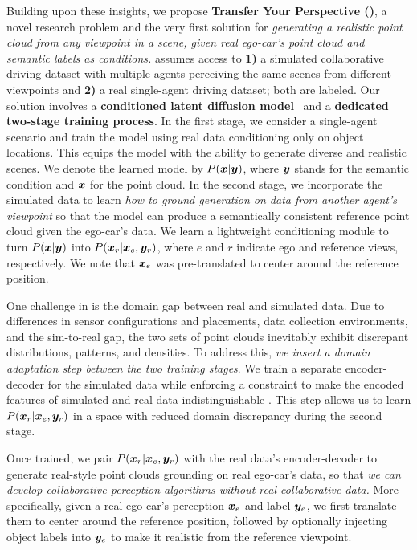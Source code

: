 Building upon these insights, we propose \textbf{Transfer Your Perspective (\ours)}, a novel research problem and the very first solution for \emph{generating a realistic point cloud from any viewpoint in a scene, given real ego-car's point cloud and semantic labels as conditions.} \ours assumes access to \textbf{1)} a simulated collaborative driving dataset with multiple agents perceiving the same scenes from different viewpoints and \textbf{2)} a real single-agent driving dataset; both are labeled.
Our solution involves a \textbf{conditioned latent diffusion model}~\citep{rombach2022high} and a \textbf{dedicated two-stage training process}. In the first stage, we consider a single-agent scenario and train the model using real data conditioning only on object locations. This equips the model with the ability to generate diverse and realistic scenes. We denote the learned model by $P({\bm{x}}|{\bm{y}})$, where ${\bm{y}}$ stands for the semantic condition and ${\bm{x}}$ for the point cloud.  
In the second stage, we incorporate the simulated data to learn \emph{how to ground generation on data from another agent's viewpoint} so that the model can produce a semantically consistent reference point cloud given the ego-car's data. 
We learn a lightweight conditioning module to turn $P({\bm{x}}|{\bm{y}})$ into $P({\bm{x}}_r|{\bm{x}}_e, {\bm{y}}_r)$, where $e$ and $r$ indicate ego and reference views, respectively. We note that ${\bm{x}}_e$ was pre-translated to center around the reference position. 

One challenge in \ours is the domain gap between real and simulated data. Due to differences in sensor configurations and placements, data collection environments, and the sim-to-real gap, the two sets of point clouds inevitably exhibit discrepant distributions, patterns, and densities. To address this, \emph{we insert a domain adaptation step between the two training stages}. We train a separate encoder-decoder for the simulated data while enforcing a constraint to make the encoded features of simulated and real data indistinguishable \citep{tzeng2017adversarial}.
This step allows us to learn $P({\bm{x}}_r|{\bm{x}}_e, {\bm{y}}_r)$ in a space with reduced domain discrepancy during the second stage.

Once trained, we pair $P({\bm{x}}_r|{\bm{x}}_e, {\bm{y}}_r)$ with the real data's encoder-decoder to generate real-style point clouds grounding on real ego-car's data, so that \emph{we can develop collaborative perception algorithms without real collaborative data.}
More specifically, given a real ego-car's perception ${\bm{x}}_e$ and label ${\bm{y}}_e$, we first translate them to center around the reference position, followed by optionally injecting object labels into ${\bm{y}}_e$ to make it realistic from the reference viewpoint. 


